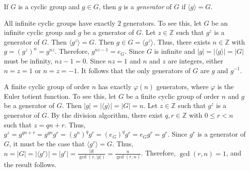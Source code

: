 \documentclass[12pt]{article}
\begin{document}
If $G$ is a cyclic group and $g \in G$, then $g$ is a {\sl generator \/} of $G$ if $\langle g \rangle =G$.

All infinite cyclic groups have exactly $2$ generators.  To see this, let $G$ be an infinite cyclic group and $g$ be a generator of $G$.  Let $z \in \mathbb{Z}$ such that $g^z$ is a generator of $G$.  Then $\langle g^z \rangle =G$.  Then $g \in G= \langle g^z \rangle$.  Thus, there exists $n \in {\mathbb Z}$ with $g=(g^z)^n=g^{nz}$.  Therefore, $g^{nz-1}=e_G$.  Since $G$ is infinite and $|g|=|\langle g \rangle |=|G|$ must be infinity, $nz-1=0$.  Since $nz=1$ and $n$ and $z$ are integers, either $n=z=1$ or $n=z=-1$.  It follows that the only generators of $G$ are $g$ and $g^{-1}$.

A finite cyclic group of order $n$ has exactly $\varphi(n)$ generators, where $\varphi$ is the Euler totient function.  To see this, let $G$ be a finite cyclic group of order $n$ and $g$ be a generator of $G$.  Then $|g|=|\langle g \rangle |=|G|=n$.  Let $z \in \mathbb{Z}$ such that $g^z$ is a generator of $G$.  By the division algorithm, there exist $q,r \in \mathbb{Z}$ with $0 \le r<n$ such that $z=qn+r$.  Thus, $g^z=g^{qn+r}=g^{qn}g^r=(g^n)^qg^r=(e_G)^qg^r=e_Gg^r=g^r$.  Since $g^r$ is a generator of $G$, it must be the case that $\langle g^r \rangle =G$.  Thus, $\displaystyle n=|G|=|\langle g^r \rangle|=|g^r|=\frac{|g|}{\gcd(r,|g|)}=\frac {n}{\gcd(r,n)}$.  Therefore, $\gcd(r,n)=1$, and the result follows.
\end{document}

